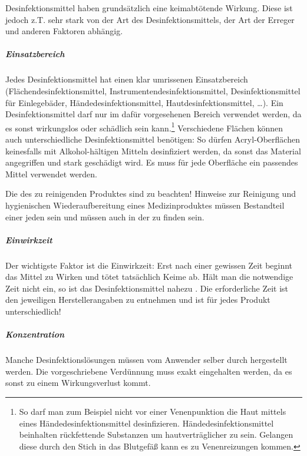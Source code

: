 {
Desinfektionsmittel haben grundsätzlich eine keimabtötende Wirkung. Diese ist
jedoch z.T. sehr stark von der Art des Desinfektionsmittels, der Art der
Erreger und anderen Faktoren abhängig.

\subparagraph{Einsatzbereich} 
Jedes Desinfektionsmittel hat einen klar umrissenen Einsatzbereich
(Flächendesinfektionsmittel, Instrumentendesinfektionsmittel,
Desinfektionsmittel für Einlegebäder, Händedesinfektionsmittel, Hautdesinfektionsmittel, \ldots{}). Ein
Desinfektionsmittel darf nur im dafür vorgesehenen Bereich verwendet werden, da
es sonst wirkungslos oder schädlich sein kann.\footnote{So darf man zum
Beispiel nicht vor einer Venenpunktion die Haut mittels eines
Händedesinfektionsmittel desinfizieren. Händedesinfektionsmittel beinhalten
rückfettende Substanzen um hautverträglicher zu sein. Gelangen diese durch den
Stich in das Blutgefäß kann es zu Venenreizungen kommen.} Verschiedene Flächen
können auch unterschiedliche Desinfektionsmittel benötigen: So dürfen
Acryl-Oberflächen keinesfalls mit Alkohol-hältigen Mitteln desinfiziert werden,
da sonst das Material angegriffen und stark geschädigt wird. Es muss für jede
Oberfläche ein passendes Mittel verwendet werden.

Die  des zu reinigenden Produktes
sind zu beachten! Hinweise zur Reinigung und hygienischen Wiederaufbereitung
eines Medizinproduktes müssen Bestandteil einer jeden  sein und
müssen auch in der  zu finden sein. 


\subparagraph{Einwirkzeit} Der wichtigste Faktor ist die Einwirkzeit: Erst nach
einer gewissen Zeit beginnt das Mittel zu Wirken und tötet tatsächlich Keime ab. Hält
man die notwendige Zeit nicht ein, so ist das Desinfektionsmittel nahezu
. Die erforderliche Zeit ist den jeweiligen Herstellerangaben
zu entnehmen und ist für jedes Produkt unterschiedlich! 

\subparagraph{Konzentration} Manche Desinfektionslösungen müssen vom Anwender
selber durch  hergestellt werden.  Die
vorgeschriebene Verdünnung muss exakt eingehalten werden, da es sonst zu einem Wirkungsverlust kommt.

}
